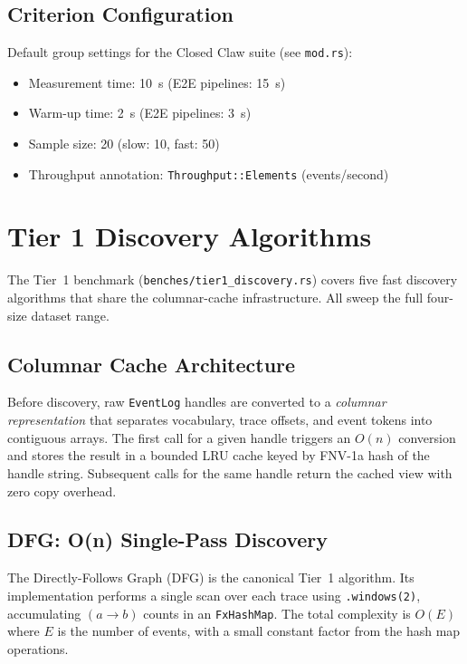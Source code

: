 \documentclass[11pt,a4paper]{article}
\begin{document}
\subsection{Criterion Configuration}

Default group settings for the Closed Claw suite (see \texttt{mod.rs}):

\begin{itemize}
  \item Measurement time: 10~s (E2E pipelines: 15~s)
  \item Warm-up time: 2~s (E2E pipelines: 3~s)
  \item Sample size: 20 (slow: 10, fast: 50)
  \item Throughput annotation: \texttt{Throughput::Elements} (events/second)
\end{itemize}

\section{Tier 1 Discovery Algorithms}
\label{sec:tier1}

The Tier~1 benchmark (\texttt{benches/tier1\_discovery.rs}) covers five
fast discovery algorithms that share the columnar-cache infrastructure.
All sweep the full four-size dataset range.

\subsection{Columnar Cache Architecture}

Before discovery, raw \texttt{EventLog} handles are converted to a
\emph{columnar representation} that separates vocabulary, trace offsets,
and event tokens into contiguous arrays. The first call for a given
handle triggers an $O(n)$ conversion and stores the result in a
bounded LRU cache keyed by FNV-1a hash of the handle string.
Subsequent calls for the same handle return the cached view with zero
copy overhead.

\subsection{DFG: O(n) Single-Pass Discovery}

The Directly-Follows Graph (DFG) is the canonical Tier~1 algorithm.
Its implementation performs a single scan over each trace using
\texttt{.windows(2)}, accumulating $(a \to b)$ counts in an
\texttt{FxHashMap}. The total complexity is $O(E)$ where $E$ is the
number of events, with a small constant factor from the hash map
operations.
\end{document}
